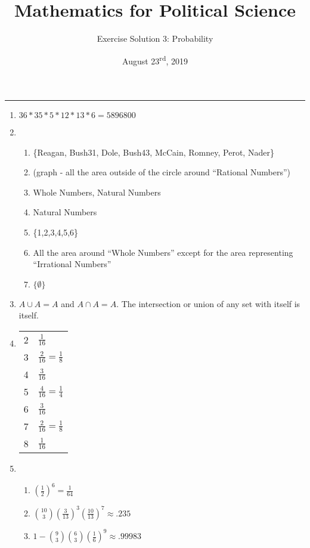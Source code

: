 \documentclass[11pt]{article}
\title{\Large{\bf{\vspace{-100pt}Mathematics for Political Science \vspace{-15pt}}}}
\author{\large{Exercise Solution 3: Probability}}
\date{August 23\textsuperscript{rd}, 2019}
\begin{document}
\maketitle

\hrule


\begin{enumerate}

\item 
$36 * 35 * 5 * 12 * 13 * 6 = 5896800$


\item 
\begin{enumerate}
\item \{Reagan, Bush31, Dole, Bush43, McCain, Romney, Perot, Nader\}
\item (graph - all the area outside of the circle around ``Rational Numbers'')
\item Whole Numbers, Natural Numbers
\item Natural Numbers
\item \{1,2,3,4,5,6\}
\item All the area around ``Whole Numbers'' except for the area representing ``Irrational Numbers''
\item $\{\emptyset\}$
\end{enumerate}


\item 
$A \cup A = A$ and $A \cap A = A$.  The intersection or union of any set with itself is itself.


\item 

\begin{small}
\begin{tabular}{c|l}
  & \\ \hline
\rule{0cm}{.5cm} 2 & $\frac{1}{16}$ \\
\rule{0cm}{.5cm} 3 & $\frac{2}{16} = \frac{1}{8}$ \\
\rule{0cm}{.5cm} 4 & $\frac{3}{16}$ \\
\rule{0cm}{.5cm} 5 & $\frac{4}{16} = \frac{1}{4}$ \\
\rule{0cm}{.5cm} 6 & $\frac{3}{16}$ \\
\rule{0cm}{.5cm} 7 & $\frac{2}{16} = \frac{1}{8}$ \\
\rule{0cm}{.5cm} 8 & $\frac{1}{16}$ \\
\end{tabular}
\end{small}


\item 
\begin{enumerate}
\item $\left(\frac{1}{2}\right)^6 = \frac{1}{64}$
\item $\binom{10}{3} \left(\frac{3}{13}\right)^3 \left(\frac{10}{13}\right)^7 \approx .235 $
\item $1 - \binom{9}{3} \binom{6}{3} \left(\frac{1}{6}\right)^9 \approx .99983 $
\end{enumerate}





\end{enumerate}
\end{document}
